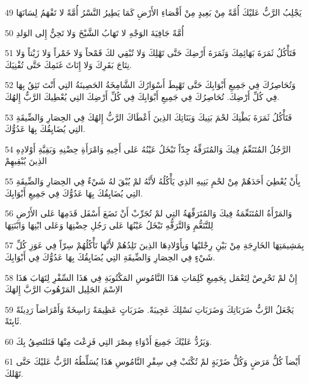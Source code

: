 \par 49 يَجْلِبُ الرَّبُّ عَليْكَ أُمَّةً مِنْ بَعِيدٍ مِنْ أَقْصَاءِ الأَرْضِ كَمَا يَطِيرُ النَّسْرُ أُمَّةً لا تَفْهَمُ لِسَانَهَا
\par 50 أُمَّةً جَافِيَةَ الوَجْهِ لا تَهَابُ الشَّيْخَ وَلا تَحِنُّ إِلى الوَلدِ
\par 51 فَتَأْكُلُ ثَمَرَةَ بَهَائِمِكَ وَثَمَرَةَ أَرْضِكَ حَتَّى تَهْلِكَ وَلا تُبْقِي لكَ قَمْحاً وَلا خَمْراً وَلا زَيْتاً وَلا نِتَاجَ بَقَرِكَ وَلا إِنَاثَ غَنَمِكَ حَتَّى تُفْنِيَكَ.
\par 52 وَتُحَاصِرُكَ فِي جَمِيعِ أَبْوَابِكَ حَتَّى تَهْبِطَ أَسْوَارُكَ الشَّامِخَةُ الحَصِينَةُ التِي أَنْتَ تَثِقُ بِهَا فِي كُلِّ أَرْضِكَ. تُحَاصِرُكَ فِي جَمِيعِ أَبْوَابِكَ فِي كُلِّ أَرْضِكَ التِي يُعْطِيكَ الرَّبُّ إِلهُكَ.
\par 53 فَتَأْكُلُ ثَمَرَةَ بَطْنِكَ لحْمَ بَنِيكَ وَبَنَاتِكَ الذِينَ أَعْطَاكَ الرَّبُّ إِلهُكَ فِي الحِصَارِ وَالضِّيقَةِ التِي يُضَايِقُكَ بِهَا عَدُوُّكَ.
\par 54 الرَّجُلُ المُتَنَعِّمُ فِيكَ وَالمُتَرَفِّهُ جِدّاً تَبْخَلُ عَيْنُهُ عَلى أَخِيهِ وَامْرَأَةِ حِضْنِهِ وَبَقِيَّةِ أَوْلادِهِ الذِينَ يُبْقِيهِمْ
\par 55 بِأَنْ يُعْطِيَ أَحَدَهُمْ مِنْ لحْمِ بَنِيهِ الذِي يَأْكُلُهُ لأَنَّهُ لمْ يُبْقَ لهُ شَيْءٌ فِي الحِصَارِ وَالضِّيقَةِ التِي يُضَايِقُكَ بِهَا عَدُوُّكَ فِي جَمِيعِ أَبْوَابِكَ.
\par 56 وَالمَرْأَةُ المُتَنَعِّمَةُ فِيكَ وَالمُتَرَفِّهَةُ التِي لمْ تُجَرِّبْ أَنْ تَضَعَ أَسْفَل قَدَمِهَا عَلى الأَرْضِ لِلتَّنَعُّمِ وَالتَّرَفُّهِ تَبْخَلُ عَيْنُهَا عَلى رَجُلِ حِضْنِهَا وَعَلى ابْنِهَا وَابْنَتِهَا
\par 57 بِمَشِيمَتِهَا الخَارِجَةِ مِنْ بَيْنِ رِجْليْهَا وَبِأَوْلادِهَا الذِينَ تَلِدُهُمْ لأَنَّهَا تَأْكُلُهُمْ سِرّاً فِي عَوَزِ كُلِّ شَيْءٍ فِي الحِصَارِ وَالضِّيقَةِ التِي يُضَايِقُكَ بِهَا عَدُوُّكَ فِي أَبْوَابِكَ.
\par 58 إِنْ لمْ تَحْرِصْ لِتَعْمَل بِجَمِيعِ كَلِمَاتِ هَذَا النَّامُوسِ المَكْتُوبَةِ فِي هَذَا السِّفْرِ لِتَهَابَ هَذَا الاِسْمَ الجَلِيل المَرْهُوبَ الرَّبَّ إِلهَكَ
\par 59 يَجْعَلُ الرَّبُّ ضَرَبَاتِكَ وَضَرَبَاتِ نَسْلِكَ عَجِيبَةً. ضَرَبَاتٍ عَظِيمَةً رَاسِخَةً وَأَمْرَاضاً رَدِيئَةً ثَابِتَةً.
\par 60 وَيَرُدُّ عَليْكَ جَمِيعَ أَدْوَاءِ مِصْرَ التِي فَزِعْتَ مِنْهَا فَتَلتَصِقُ بِكَ.
\par 61 أَيْضاً كُلُّ مَرَضٍ وَكُلُّ ضَرْبَةٍ لمْ تُكْتَبْ فِي سِفْرِ النَّامُوسِ هَذَا يُسَلِّطُهُ الرَّبُّ عَليْكَ حَتَّى تَهْلكَ.
